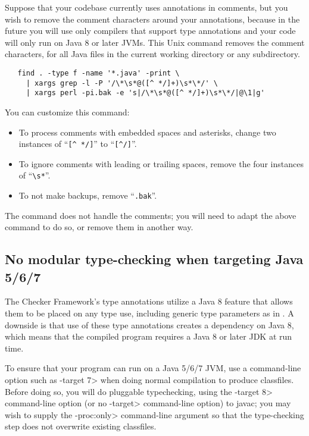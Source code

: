 Suppose that your codebase currently uses annotations in comments, but you
wish to remove the comment characters around your annotations, because in
the future you will use only compilers that support type annotations and
your code will only run on Java 8 or later JVMs.
This Unix command removes
the comment characters, for all Java files in the current
working directory or any subdirectory.

\begin{Verbatim}
   find . -type f -name '*.java' -print \
     | xargs grep -l -P '/\*\s*@([^ */]+)\s*\*/' \
     | xargs perl -pi.bak -e 's|/\*\s*@([^ */]+)\s*\*/|@\1|g'
\end{Verbatim}

You can customize this command:
\begin{itemize}
\item
To process comments with embedded spaces and asterisks, change
two instances of ``\verb|[^ */]|'' to ``\verb|[^/]|''.
\item
To ignore comments with leading or trailing spaces, remove the four
instances of ``\verb|\s*|''.
\item
  To not make backups, remove ``\verb|.bak|''.
\end{itemize}

The command does not handle the \code{>>>} comments; you will need to
adapt the above command to do so, or remove them in another way.


\subsection{No modular type-checking when targeting Java 5/6/7\label{no-modular-type-checking-java7-jvm}}

The Checker Framework's type annotations utilize a Java 8 feature that
allows them to be placed on any type use, including generic type parameters
as in \code{List<@NonNull String>}.  A downside is that use of these type
annotations creates a dependency on Java 8, which means that the compiled
program requires a Java 8 or later JDK at run time. 

To ensure that your program can run on a Java 5/6/7 JVM, use a command-line
option such as \<-target 7> when doing normal compilation to produce
classfiles.  Before doing so, you will do pluggable typechecking, using the
\<-target 8> command-line option (or no \<-target> command-line option) to
javac; you may wish to supply the \<-proc:only> command-line argument so
that the type-checking step does not overwrite existing classfiles.

